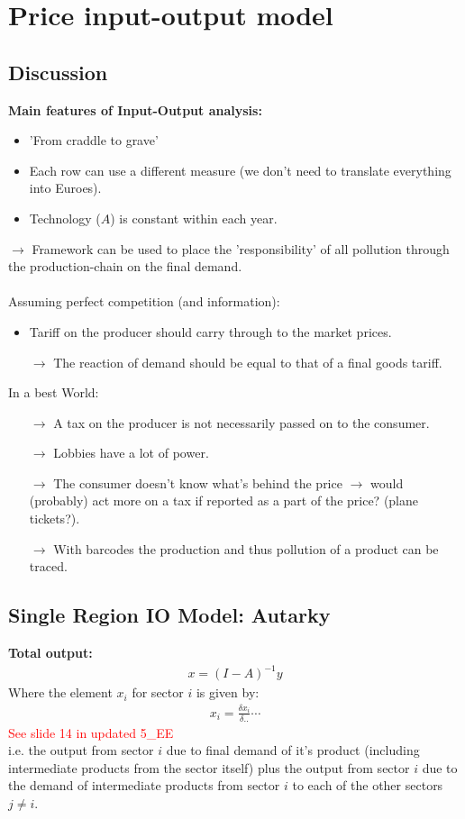\section{Price input-output model} %
\begin{multicols}{2}\noindent
 \subsection{Discussion}\noindent
 \textbf{Main features of Input-Output analysis:}
 \begin{itemize}
  \item 'From craddle to grave'
  \item Each row can use a different measure (we don't need to translate everything into Euroes).
  \item Technology ($A$) is constant within each year.
 \end{itemize}
 $\rightarrow$ Framework can be used to place the 'responsibility' of all pollution through the production-chain on the final demand.
 \\ \\
 Assuming perfect competition (and information):
 \begin{itemize}
  \item Tariff on the producer should carry through to the market prices.
  \item[$\rightarrow$] The reaction of demand should be equal to that of a final goods tariff.
 \end{itemize}
 In a  best World:
 \begin{itemize}
  \item[$\rightarrow$] A tax on the producer is not necessarily passed on to the consumer.
  \item[$\rightarrow$] Lobbies have a lot of power.
  \item[$\rightarrow$] The consumer doesn't know what's behind the price $\rightarrow$ would (probably) act more on a tax if reported as a part of the price? (plane tickets?).
  \item[$\rightarrow$] With barcodes the production and thus pollution of a product can be traced.
 \end{itemize}
 \subsection{Single Region IO Model: Autarky}
 \textbf{Total output:}
 \begin{align*}
  x=(I-A)^{-1}y
 \end{align*}
 Where the element $x_i$ for sector $i$ is given by:
 \begin{align*}
  x_i=\frac{\delta x_i}{\delta..}\cdots
 \end{align*}
 \textcolor{red}{See slide 14 in updated 5\_EE}\\
 i.e. the output from sector $i$ due to final demand of it's product (including intermediate products from the sector itself) plus the output from sector $i$ due to the demand of intermediate products from sector $i$ to each of the other sectors $j\neq i$.


\end{multicols}
